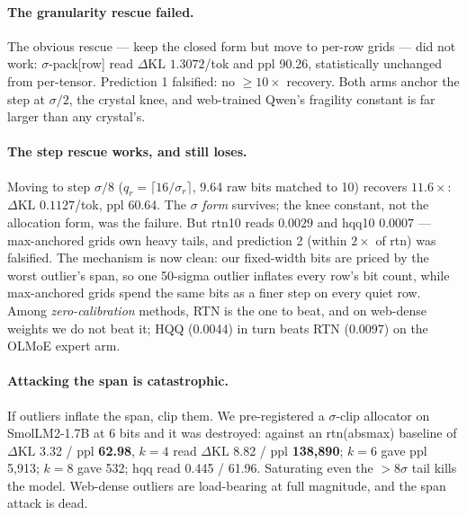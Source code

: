 \documentclass[11pt]{article}
\newcommand{\dkl}{\ensuremath{\Delta\mathrm{KL}}}
\begin{document}
\paragraph{The granularity rescue failed.}
The obvious rescue --- keep the closed form but move to per-row grids --- did
not work: $\sigma$-pack[row] read \dkl{} $1.3072$/tok and ppl 90.26,
statistically unchanged from per-tensor. Prediction 1 falsified: no $\geq
10\times$ recovery. %
Both arms anchor the step at $\sigma/2$, the crystal knee, and web-trained
Qwen's fragility constant is far larger than any crystal's.

\paragraph{The step rescue works, and still loses.}
Moving to step $\sigma/8$ ($q_r = \lceil 16/\sigma_r \rceil$, 9.64 raw bits
matched to 10) recovers $11.6\times$: \dkl{} $0.1127$/tok, ppl 60.64. The
$\sigma$ \emph{form} survives; the knee constant, not the allocation form, was
the failure. But rtn10 reads $0.0029$ and hqq10 $0.0007$ --- max-anchored grids
own heavy tails, and prediction 2 (within $2\times$ of rtn) was falsified.
The mechanism is now clean: our fixed-width bits are priced by the worst
outlier's span, so one 50-sigma outlier inflates every row's bit count, while
max-anchored grids spend the same bits as a finer step on every quiet row.
Among \emph{zero-calibration} methods, RTN is the one to beat, and on web-dense
weights we do not beat it; HQQ (0.0044) in turn beats RTN (0.0097) on the OLMoE
expert arm. %

\paragraph{Attacking the span is catastrophic.}
If outliers inflate the span, clip them. We pre-registered a $\sigma$-clip
allocator on SmolLM2-1.7B at 6 bits and it was destroyed: against an
rtn(absmax) baseline of \dkl{} 3.32 / ppl \textbf{62.98}, $k{=}4$ read \dkl{}
8.82 / ppl \textbf{138{,}890}; $k{=}6$ gave ppl 5{,}913; $k{=}8$ gave 532; hqq
read 0.445 / 61.96. %
Saturating even the $>\!8\sigma$ tail kills the model. Web-dense outliers are
load-bearing at full magnitude, and the span attack is dead.
\end{document}

